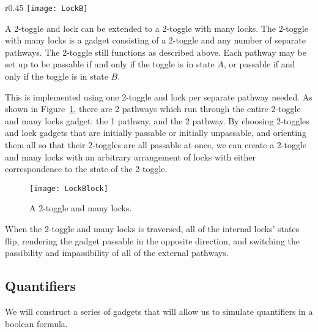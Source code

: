 \begin{wrapfigure}{r}{0.45\textwidth}
  \centering
    \texttt{[image: LockB]}
    \caption{Diagram of a lock. The $3a$ to $4a$ traversal is only possible in state $A$ and returns the toggle to state $A$.}
    \label{fig:LockA}
\end{wrapfigure}

A 2-toggle and lock can be extended to a 2-toggle with many locks. The 2-toggle with many locks is a gadget consisting of a 2-toggle
and any number of separate pathways. The 2-toggle still functions as described above.
Each pathway may be set up to be passable if and only if the toggle is in state $A$, or passable if and only if the toggle is in state $B$. 

This is
implemented using one 2-toggle and lock per separate pathway needed. As shown in Figure~\ref{fig:LockBlock}, there are 2
pathways which run through the entire 2-toggle and many locks gadget: the 1 pathway, and the 2 pathway. 
By choosing 2-toggles and lock gadgets that are initially passable or initially unpassable, and orienting them all so that 
their 2-toggles are all passable at once, we can create a 2-toggle and many locks with an arbitrary arrangement of locks with 
either correspondence to the state of the 2-toggle.
\begin{figure}[hb]
\centering
    \texttt{[image: LockBlock]}
    \caption{A 2-toggle and many locks.}
    \label{fig:LockBlock}
\end{figure}

When the 2-toggle and many locks is traversed, all of the internal locks' states flip, rendering the gadget passable in the opposite direction, and switching the passibility and impassibility of all of the external pathways.

\subsection{Quantifiers}

We will construct a series of gadgets that will allow us to simulate quantifiers in a boolean formula.

